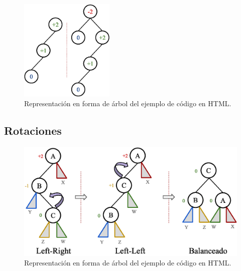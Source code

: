 \begin{figure}[htpb!]
  \begin{center}
    \includegraphics[width=0.4\textwidth]{images/AVLExample2.eps}
  \end{center}
  \caption{Representación en forma de árbol del ejemplo de código en HTML.}
  \label{fig:AVLExample2}
\end{figure}

\subsection{Rotaciones}

\begin{figure}[htpb!]
  \begin{center}
    \includegraphics[width=1.0\textwidth]{images/AVLRotation1.eps}
  \end{center}
  \caption{Representación en forma de árbol del ejemplo de código en HTML.}
  \label{fig:AVLRotation1}
\end{figure}

